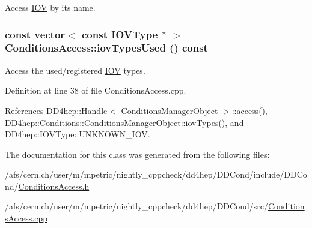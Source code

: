 Access \hyperlink{class_d_d4hep_1_1_i_o_v}{IOV} by its name. \hypertarget{class_d_d4hep_1_1_conditions_1_1_conditions_access_a7e29a0f6c92bfaa2e0d77772658493d2}{
\subsubsection[{iovTypesUsed}]{\setlength{\rightskip}{0pt plus 5cm}const {\bf vector}$<$ const {\bf IOVType} $\ast$ $>$ ConditionsAccess::iovTypesUsed () const}}
\label{class_d_d4hep_1_1_conditions_1_1_conditions_access_a7e29a0f6c92bfaa2e0d77772658493d2}


Access the used/registered \hyperlink{class_d_d4hep_1_1_i_o_v}{IOV} types. 

Definition at line 38 of file ConditionsAccess.cpp.

References DD4hep::Handle$<$ ConditionsManagerObject $>$::access(), DD4hep::Conditions::ConditionsManagerObject::iovTypes(), and DD4hep::IOVType::UNKNOWN\_\-IOV.

The documentation for this class was generated from the following files:\begin{DoxyCompactItemize}
\item 
/afs/cern.ch/user/m/mpetric/nightly\_\-cppcheck/dd4hep/DDCond/include/DDCond/\hyperlink{_conditions_access_8h}{ConditionsAccess.h}\item 
/afs/cern.ch/user/m/mpetric/nightly\_\-cppcheck/dd4hep/DDCond/src/\hyperlink{_conditions_access_8cpp}{ConditionsAccess.cpp}\end{DoxyCompactItemize}

